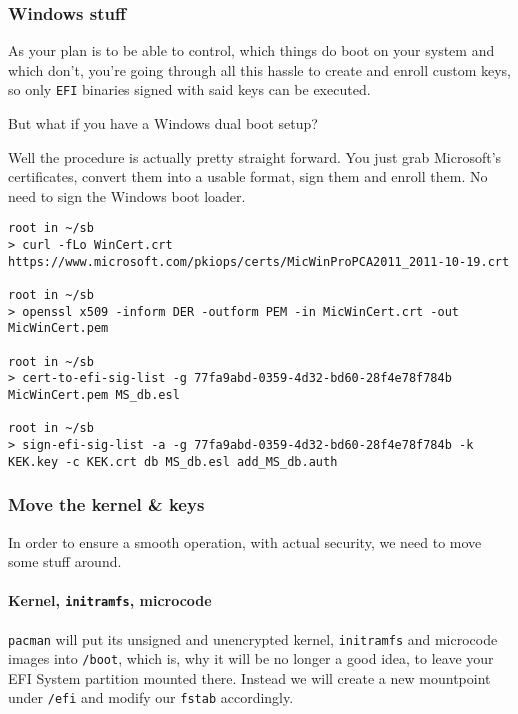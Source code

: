 \documentclass[10pt]{dustdoc}
\begin{document}
\subsubsection{Windows stuff}%
\label{sec:windows-stuff}

As your plan is to be able to control, which things do boot on your system and which don’t, you’re going through all this hassle to create and enroll custom keys, so only \texttt{EFI} binaries signed with said keys can be executed.

But what if you have a Windows dual boot setup?

Well the procedure is actually pretty straight forward.
You just grab Microsoft’s certificates, convert them into a usable format, sign them and enroll them.
No need to sign the Windows boot loader.

\begin{verbatim}
root in ~/sb
> curl -fLo WinCert.crt https://www.microsoft.com/pkiops/certs/MicWinProPCA2011_2011-10-19.crt

root in ~/sb
> openssl x509 -inform DER -outform PEM -in MicWinCert.crt -out MicWinCert.pem

root in ~/sb
> cert-to-efi-sig-list -g 77fa9abd-0359-4d32-bd60-28f4e78f784b MicWinCert.pem MS_db.esl

root in ~/sb
> sign-efi-sig-list -a -g 77fa9abd-0359-4d32-bd60-28f4e78f784b -k KEK.key -c KEK.crt db MS_db.esl add_MS_db.auth
\end{verbatim}


\subsubsection{Move the kernel \& keys}%
\label{sec:move-the-kernel-and-keys}

In order to ensure a smooth operation, with actual security, we need to move some stuff around.

\paragraph{Kernel, \texttt{initramfs}, microcode}%
\label{par:kernel-initramfs-microcode}

\texttt{pacman} will put its unsigned and unencrypted kernel, \texttt{initramfs} and microcode images into \texttt{/boot}, which is, why it will be no longer a good idea, to leave your EFI System partition mounted there.
Instead we will create a new mountpoint under \texttt{/efi} and modify our \texttt{fstab} accordingly.
\end{document}
